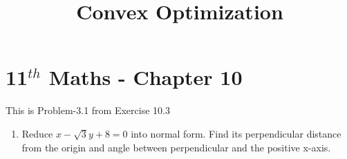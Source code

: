 \documentclass[12pt]{article}
\begin{document}
\begin{center}
\title{\textbf{Convex Optimization}}
\date{\vspace{-5ex}} %
\maketitle
\end{center}
\setcounter{page}{1}

\section{11$^{th}$ Maths - Chapter 10}
This is Problem-3.1 from Exercise 10.3 
\begin{enumerate}
\item Reduce $x-\sqrt{3}y+8=0$ into normal form. Find its perpendicular distance from the origin and angle between perpendicular and the positive x-axis. 


\end{enumerate}
\end{document}
